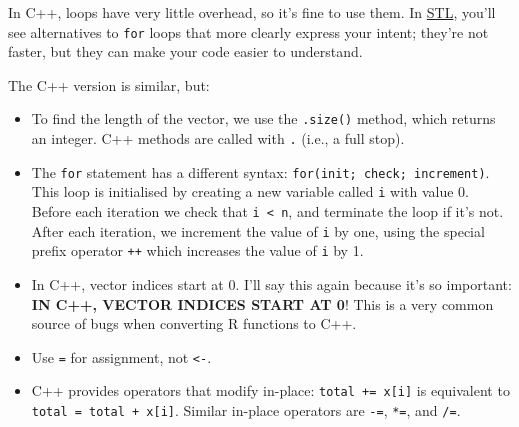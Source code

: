 \begin{Shaded}
\begin{Highlighting}[]
\StringTok{ }
  \StringTok{ }
    \StringTok{ }\StringTok{ }
  \NormalTok{\}}
\NormalTok{\}}
\end{Highlighting}
\end{Shaded}

In C++, loops have very little overhead, so it's fine to use them. In
\hyperref[stl]{STL}, you'll see alternatives to \texttt{for} loops that
more clearly express your intent; they're not faster, but they can make
your code easier to understand.

\begin{Shaded}
\begin{Highlighting}[]
\NormalTok{(}
\StringTok{  \}}
\NormalTok{)}
\end{Highlighting}
\end{Shaded}

The C++ version is similar, but:

\begin{itemize}
\item
  To find the length of the vector, we use the \texttt{.size()} method,
  which returns an integer. C++ methods are called with \texttt{.}
  (i.e., a full stop).
\item
  The \texttt{for} statement has a different syntax:
  \texttt{for(init; check; increment)}. This loop is initialised by
  creating a new variable called \texttt{i} with value 0. Before each
  iteration we check that \texttt{i \textless{} n}, and terminate the
  loop if it's not. After each iteration, we increment the value of
  \texttt{i} by one, using the special prefix operator \texttt{++} which
  increases the value of \texttt{i} by 1.
\item
  In C++, vector indices start at 0. I'll say this again because it's so
  important: \textbf{IN C++, VECTOR INDICES START AT 0}! This is a very
  common source of bugs when converting R functions to C++.
\item
  Use \texttt{=} for assignment, not \texttt{\textless{}-}.
\item
  C++ provides operators that modify in-place:
  \texttt{total += x{[}i{]}} is equivalent to
  \texttt{total = total + x{[}i{]}}. Similar in-place operators are
  \texttt{-=}, \texttt{*=}, and \texttt{/=}.
\end{itemize}

